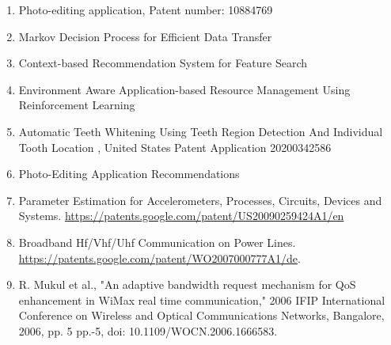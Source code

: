 
	
\begin{enumerate}
	\vspace{10pt}
	
	\item{Photo-editing application, Patent number: 10884769}
	
	\item{ Markov Decision Process for Efficient Data Transfer}
	
	\item{Context-based Recommendation System for Feature Search}
	
	\item{Environment Aware Application-based Resource Management Using Reinforcement Learning}
	
	\item{ Automatic Teeth Whitening Using Teeth Region Detection And Individual Tooth Location
		, United States Patent Application 20200342586}
	
	\item{Photo-Editing Application Recommendations}
	
	\item {Parameter Estimation for Accelerometers, Processes, Circuits, Devices and Systems. \href {https://patents.google.com/patent/US20090259424A1/en}{https://patents.google.com/patent/US20090259424A1/en}}
	
	\item{Broadband Hf/Vhf/Uhf Communication on Power Lines. \href{https://patents.google.com/patent/WO2007000777A1/de}{https://patents.google.com/patent/WO2007000777A1/de}.}
	
	\item {R. Mukul et al., "An adaptive bandwidth request mechanism for QoS enhancement in WiMax real time communication," 2006 IFIP International Conference on Wireless and Optical Communications Networks, Bangalore, 2006, pp. 5 pp.-5, doi: 10.1109/WOCN.2006.1666583.
	}
\end{enumerate}